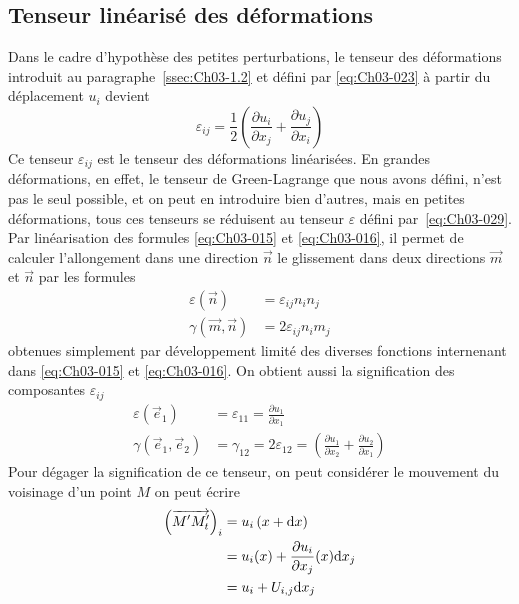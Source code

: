 \subsection{Tenseur linéarisé des déformations} \label{ssec:Ch03-2.2}
Dans le cadre d'hypothèse des petites perturbations, le tenseur des déformations introduit au paragraphe~\ref{ssec:Ch03-1.2} et défini par \eqref{eq:Ch03-023} à partir du déplacement $u_i$ devient
\begin{equation}
    \varepsilon_{ij} = \frac{1}{2} \left( \frac{\partial u_i}{\partial x_j} + \frac{\partial u_j}{\partial x_i} \right)
    \label{eq:Ch03-029}
\end{equation}
Ce tenseur $\varepsilon_{ij}$ est le tenseur des déformations linéarisées.
En grandes déformations, en effet, le tenseur de Green-Lagrange que nous avons défini, n'est pas le seul possible, et on peut en introduire bien d'autres, mais en petites déformations, tous ces tenseurs se réduisent au tenseur $\mathbb{\varepsilon}$ défini par~\eqref{eq:Ch03-029}.
Par linéarisation des formules \eqref{eq:Ch03-015} et \eqref{eq:Ch03-016}, il permet de calculer l'allongement dans une direction $\vec{n}$ le glissement dans deux directions $\vec{m}$ et $\vec{n}$ par les formules
\begin{align}
    \varepsilon \left( \vec{n} \right) &= \varepsilon_{ij} n_i n_j \label{eq:Ch03-030} \\
    \gamma \left( \vec{m}, \vec{n} \right) &= 2 \varepsilon_{ij} n_i m_j \label{eq:Ch03-031} 
\end{align}
obtenues simplement par développement limité des diverses fonctions internenant dans \eqref{eq:Ch03-015} et \eqref{eq:Ch03-016}.
On obtient aussi la signification des composantes $\varepsilon_{ij}$
\begin{align}
    \varepsilon \left( \vec{e}_1 \right) &= \varepsilon_{11} = \frac{\partial u_1}{\partial x_1} \label{eq:Ch03-032} \\
    \gamma \left( \vec{e}_1, \vec{e}_2 \right) &= \gamma_{12} = 2 \varepsilon_{12} = \left( \frac{\partial u_1}{\partial x_2} + \frac{\partial u_2}{\partial x_1} \right) \label{eq:Ch03-033}
\end{align}
Pour dégager la signification de ce tenseur, on peut considérer le mouvement du voisinage d'un point $M$ on peut écrire
\begin{align*}
    \left( \overrightarrow{M'M_t'} \right)_i &= u_i \left( x + \mathrm{d} x \right) \\
    &= u_i (x) + \frac{\partial u_i}{\partial x_j} (x) \mathrm{d} x_j\\
    &= u_i + U_{i,j} \mathrm{d} x_j
\end{align*}
